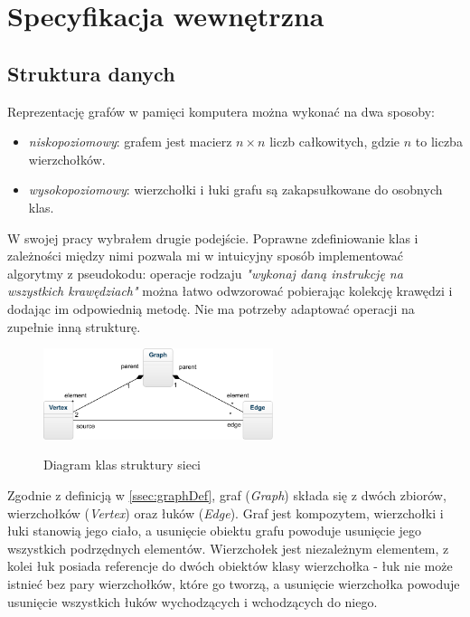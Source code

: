 \chapter{Specyfikacja wewnętrzna}
\section{Struktura danych}
Reprezentację grafów w pamięci komputera można wykonać na dwa sposoby:
\begin{itemize}
	\item \textit{niskopoziomowy}: grafem jest macierz $ n\times n $ liczb całkowitych, gdzie $ n $ to liczba wierzchołków.\cite{id:AlgorytmyStruktury}
	\item \textit{wysokopoziomowy}: wierzchołki i łuki grafu są zakapsułkowane do osobnych klas.\cite{id:ZaawansowaneAlgorytmyStruktury}
\end{itemize}
W swojej pracy wybrałem drugie podejście. Poprawne zdefiniowanie klas i zależności między nimi pozwala mi w intuicyjny sposób implementować algorytmy z pseudokodu: operacje rodzaju \textit{"wykonaj daną instrukcję na wszystkich krawędziach"} można łatwo odwzorować pobierając kolekcję krawędzi i dodając im odpowiednią metodę. Nie ma potrzeby adaptować operacji na zupełnie inną strukturę.
\begin{figure}[H]
	\centering
	\includegraphics[width=0.6\textwidth]{./img/dane}
	\label{fig:graphStructure}
	\caption{Diagram klas struktury sieci}
\end{figure}
Zgodnie z definicją w \ref{ssec:graphDef}, graf (\emph{Graph}) składa się z dwóch zbiorów, wierzchołków (\emph{Vertex}) oraz łuków (\emph{Edge}). Graf jest kompozytem, wierzchołki i łuki stanowią jego ciało, a usunięcie obiektu grafu powoduje usunięcie jego wszystkich podrzędnych elementów. Wierzchołek jest niezależnym elementem, z kolei łuk posiada referencje do dwóch obiektów klasy wierzchołka - łuk nie może istnieć bez pary wierzchołków, które go tworzą, a usunięcie wierzchołka powoduje usunięcie wszystkich łuków wychodzących i wchodzących do niego.
